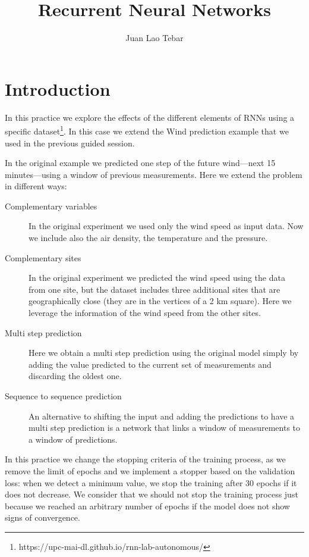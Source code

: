 \documentclass[]{article}
\title{Recurrent Neural Networks}
\author{Juan Lao Tebar}
\begin{document}
	
	\maketitle
	
	\section{Introduction} 

	In this practice we explore the effects of the different elements of RNNs using a specific dataset\footnote{https://upc-mai-dl.github.io/rnn-lab-autonomous/}. In this case we extend the Wind prediction example that we used in the previous guided session.
	
	In the original example we predicted one step of the future wind---next 15 minutes---using a window of previous measurements. Here we extend the problem in different ways:
	
	\begin{description}
		\item [Complementary variables] In the original experiment we used only the wind speed as input data. Now we include also the air density, the temperature and the pressure.
		
		\item [Complementary sites] In the original experiment we predicted the wind speed using the data from one site, but the dataset includes three additional sites that are geographically close (they are in the vertices of a 2 km square). Here we leverage the information of the wind speed from the other sites.
		
		\item [Multi step prediction] Here we obtain a multi step prediction using the original model simply by adding the value predicted to the current set of measurements and discarding the oldest one.
		
		\item [Sequence to sequence prediction] An alternative to shifting the input and adding the predictions to have a multi step prediction is a network that links a window of measurements to a window of predictions.
	\end{description}
	
	In this practice we change the stopping criteria of the training process, as we remove the limit of epochs and we implement a stopper based on the validation loss: when we detect a minimum value, we stop the training after 30 epochs if it does not decrease. We consider that we should not stop the training process just because we reached an arbitrary number of epochs if the model does not show signs of convergence.
	
\end{document}
